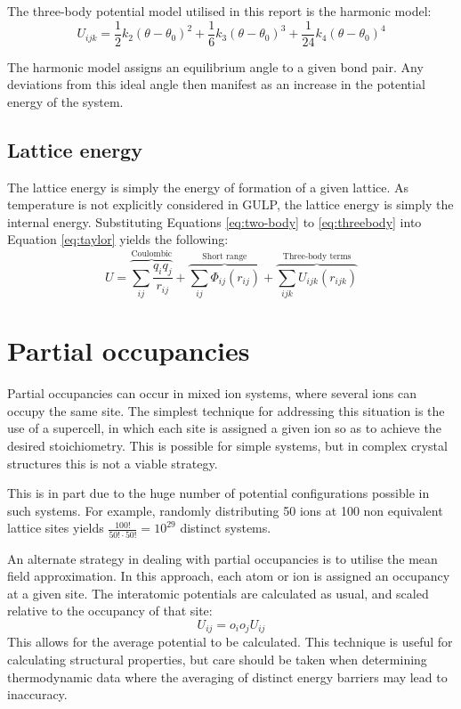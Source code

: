 The three-body potential model utilised in this report is the harmonic model:
\begin{equation}
  U_{ijk} = \frac{1}{2}k_2(\theta-\theta_0)^2   + \frac{1}{6}k_3(\theta-\theta_0)^3    + \frac{1}{24}k_4(\theta-\theta_0)^4
  \label{eq:threebody}
\end{equation}

The harmonic model assigns an equilibrium angle to a given bond pair.
Any deviations from this ideal angle then manifest as an increase in the potential energy of the system.

\subsection{Lattice energy}
The lattice energy is simply the energy of formation of a given lattice.
As temperature is not explicitly considered in GULP, the lattice energy is simply the internal energy.
Substituting Equations \ref{eq:two-body} to \ref{eq:threebody} into Equation \ref{eq:taylor} yields the following:
\begin{equation}
U = \overbrace{\sum_{ij} \frac{q_iq_j}{r_{ij}}}^\text{Coulombic} + \overbrace{\sum_{ij} \Phi_{ij}(r_{ij})}^\text{Short range} + \overbrace{\sum_{ijk} U_{ijk}(r_{ijk})}^\text{Three-body terms}
\end{equation}

\section{Partial occupancies}
Partial occupancies can occur in mixed ion systems, where several ions can occupy the same site.
The simplest technique for addressing this situation is the use of a supercell, in which each site is assigned a given ion so as to achieve the desired stoichiometry.
This is possible for simple systems, but in complex crystal structures this is not a viable strategy.

This is in part due to the huge number of potential configurations possible in such systems.
For example, randomly distributing 50 ions at 100 non equivalent lattice sites yields $\frac{100!}{50!\cdot50!} = 10^{29}$ distinct systems.

An alternate strategy in dealing with partial occupancies is to utilise the mean field approximation.
In this approach, each atom or ion is assigned an occupancy at a given site.
The interatomic potentials are calculated as usual, and scaled relative to the occupancy of that site:
$$
U_{ij} = o_io_jU_{ij}
$$
This allows for the average potential to be calculated.
This technique is useful for calculating structural properties, but care should be taken when determining thermodynamic data where the averaging of distinct energy barriers may lead to inaccuracy.

